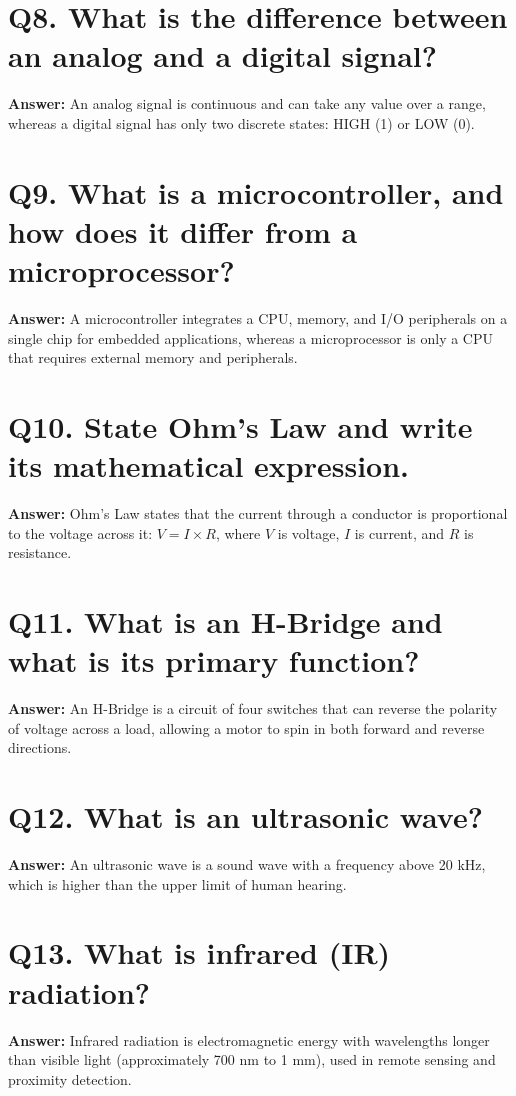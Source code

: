 \documentclass[12pt,a4paper,oneside]{report}
\begin{document}
\section{Q8. What is the difference between an analog and a digital signal?}
\textbf{Answer:} An analog signal is continuous and can take any value over a range, whereas a digital signal has only two discrete states: HIGH (1) or LOW (0).

\section{Q9. What is a microcontroller, and how does it differ from a microprocessor?}
\textbf{Answer:} A microcontroller integrates a CPU, memory, and I/O peripherals on a single chip for embedded applications, whereas a microprocessor is only a CPU that requires external memory and peripherals.

\section{Q10. State Ohm's Law and write its mathematical expression.}
\textbf{Answer:} Ohm's Law states that the current through a conductor is proportional to the voltage across it: $V = I \times R$, where $V$ is voltage, $I$ is current, and $R$ is resistance.

\section{Q11. What is an H-Bridge and what is its primary function?}
\textbf{Answer:} An H-Bridge is a circuit of four switches that can reverse the polarity of voltage across a load, allowing a motor to spin in both forward and reverse directions.

\section{Q12. What is an ultrasonic wave?}
\textbf{Answer:} An ultrasonic wave is a sound wave with a frequency above 20 kHz, which is higher than the upper limit of human hearing.

\section{Q13. What is infrared (IR) radiation?}
\textbf{Answer:} Infrared radiation is electromagnetic energy with wavelengths longer than visible light (approximately 700 nm to 1 mm), used in remote sensing and proximity detection.
\end{document}
